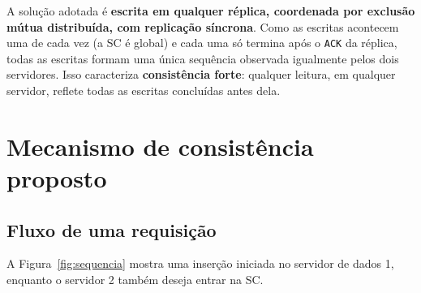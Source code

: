 \documentclass[11pt,a4paper]{article}
\newcommand{\msg}[1]{\texttt{#1}}
\begin{document}
A solução adotada é \textbf{escrita em qualquer réplica, coordenada por exclusão
mútua distribuída, com replicação síncrona}. Como as escritas acontecem uma de cada
vez (a SC é global) e cada uma só termina após o \msg{ACK} da réplica, todas as
escritas formam uma única sequência observada igualmente pelos dois servidores. Isso
caracteriza \textbf{consistência forte}: qualquer leitura, em qualquer servidor,
reflete todas as escritas concluídas antes dela.

\section{Mecanismo de consistência proposto}
\label{sec:mecanismo}

\subsection{Fluxo de uma requisição}

A Figura~\ref{fig:sequencia} mostra uma inserção iniciada no servidor de dados 1,
enquanto o servidor 2 também deseja entrar na SC.
\end{document}
